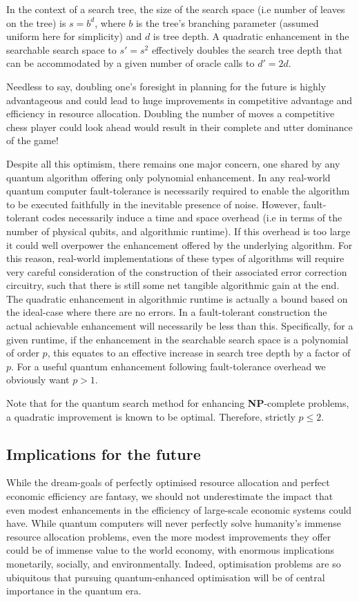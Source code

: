 In the context of a search tree, the size of the search space (i.e number of leaves on the tree) is \mbox{$s=b^d$},
where $b$ is the tree's branching parameter (assumed uniform here for simplicity) and $d$ is tree depth. A quadratic enhancement in the searchable search space to \mbox{$s'=s^2$} effectively doubles the search tree depth that can be accommodated by a given number of oracle calls to \mbox{$d'=2d$}.

Needless to say, doubling one's foresight in planning for the future is highly advantageous and could lead to huge improvements in competitive advantage and efficiency in resource allocation. Doubling the number of moves a competitive chess player could look ahead would result in their complete and utter dominance of the game!

Despite all this optimism, there remains one major concern, one shared by any quantum algorithm offering only polynomial enhancement. In any real-world quantum computer fault-tolerance is necessarily required to enable the algorithm to be executed faithfully in the inevitable presence of noise. However, fault-tolerant codes necessarily induce a time and space overhead (i.e in terms of the number of physical qubits, and algorithmic runtime). If this overhead is too large it could well overpower the   enhancement offered by the underlying algorithm. For this reason, real-world implementations of these types of algorithms will require very careful consideration of the construction of their associated error correction circuitry, such that there is still some net tangible algorithmic gain at the end. The quadratic enhancement in algorithmic runtime is actually a bound based on the ideal-case where there are no errors. In a fault-tolerant construction the actual achievable enhancement will necessarily be less than this. Specifically, for a given runtime, if the enhancement in the searchable search space is a polynomial of order $p$, this equates to an effective increase in search tree depth by a factor of $p$. For a useful quantum enhancement following fault-tolerance overhead we obviously want \mbox{$p>1$}.

Note that for the quantum search method for enhancing \textbf{NP}-complete problems, a quadratic improvement is known to be optimal. Therefore, strictly \mbox{$p\leq 2$}.

\subsection{Implications for the future}

While the dream-goals of perfectly optimised resource allocation and perfect economic efficiency are fantasy, we should not underestimate the impact that even modest enhancements in the efficiency of large-scale economic systems could have. While quantum computers will never perfectly solve humanity's immense resource allocation problems, even the more modest improvements they offer could be of immense value to the world economy, with enormous implications monetarily, socially, and environmentally. Indeed, optimisation problems are so ubiquitous that pursuing quantum-enhanced optimisation will be of central importance in the quantum era.